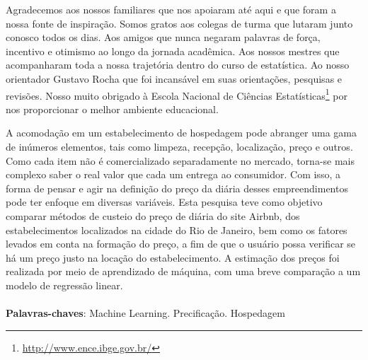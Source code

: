 \documentclass[
	12pt,				%
	a4paper,		%
	oneside,    %
	chapter=TITLE,		   %
	section=TITLE,		   %
	subsection=TITLE,	   %
	subsubsection=TITLE, %
	english,			%
	french,				%
	spanish,			%
	brazil,				%
]{abntex2}
\begin{document}
\pretextual

\makeindex

\imprimircapa

\imprimirfolhaderosto*


\imprimitfolhadeaprovacao

\begin{agradecimentos}
	Agradecemos aos nossos familiares que nos apoiaram até aqui e que foram
a nossa fonte de inspiração. Somos gratos aos colegas de turma que
lutaram junto conosco todos os dias. Aos amigos que nunca negaram
palavras de força, incentivo e otimismo ao longo da jornada acadêmica.
Aos nossos mestres que acompanharam toda a nossa trajetória dentro do
curso de estatística. Ao nosso orientador Gustavo Rocha que foi
incansável em suas orientações, pesquisas e revisões. Nosso muito
obrigado à Escola Nacional de Ciências
Estatísticas\footnote{\url{http://www.ence.ibge.gov.br/}} por nos
proporcionar o melhor ambiente educacional.
\end{agradecimentos}


\setlength{\absparsep}{18pt} %
\begin{resumo}
	A acomodação em um estabelecimento de hospedagem pode abranger uma gama
de inúmeros elementos, tais como limpeza, recepção, localização, preço e
outros. Como cada item não é comercializado separadamente no mercado,
torna-se mais complexo saber o real valor que cada um entrega ao
consumidor. Com isso, a forma de pensar e agir na definição do preço da
diária desses empreendimentos pode ter enfoque em diversas variáveis.
Esta pesquisa teve como objetivo comparar métodos de custeio do preço de
diária do site Airbnb, dos estabelecimentos localizados na cidade do Rio
de Janeiro, bem como os fatores levados em conta na formação do preço, a
fim de que o usuário possa verificar se há um preço justo na locação do
estabelecimento. A estimação dos preços foi realizada por meio de
aprendizado de máquina, com uma breve comparação a um modelo de
regressão linear.
	\noindent
	\\
	\\
	\textbf{Palavras-chaves}: Machine Learning. Precificação. Hospedagem
\end{resumo}
\end{document}

